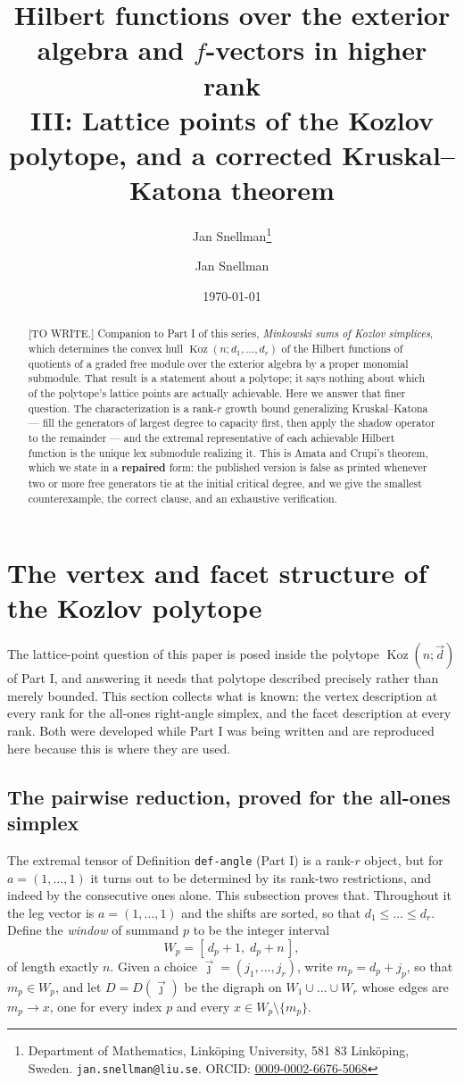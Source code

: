 \documentclass[11pt, a4paper, abstract=yes]{scrartcl}
\author{Jan Snellman\thanks{Department of Mathematics, Linköping University, 581 83 Linköping, Sweden. \texttt{jan.snellman@liu.se}. ORCID: \href{https://orcid.org/0009-0002-6676-5068}{0009-0002-6676-5068}}}
\author{Jan Snellman \orcidlink{0009-0002-6676-5068}}
\date{\today}
\title{Hilbert functions over the exterior algebra and \(f\)-vectors in higher rank\\\medskip
\large III: Lattice points of the Kozlov polytope, and a corrected Kruskal--Katona theorem}
\theoremstyle{definition}
\theoremstyle{remark}
\theoremstyle{plain}
\newcommand{\Koz}{\operatorname{Koz}}
\begin{document}
\maketitle
\begin{abstract}
{[}TO WRITE.] Companion to Part I of this series, \emph{Minkowski sums of Kozlov simplices}, which determines the convex hull \(\Koz(n;d_1,\dots,d_r)\) of
the Hilbert functions of quotients of a graded free module over the exterior algebra by a proper
monomial submodule. That result is a statement about a polytope; it says nothing about which of the
polytope's lattice points are actually achievable. Here we answer that finer question. The
characterization is a rank-\(r\) growth bound generalizing Kruskal--Katona --- fill the generators of
largest degree to capacity first, then apply the shadow operator to the remainder --- and the
extremal representative of each achievable Hilbert function is the unique lex submodule realizing
it. This is Amata and Crupi's theorem, which we state in a \textbf{repaired} form: the published version is
false as printed whenever two or more free generators tie at the initial critical degree, and we give
the smallest counterexample, the correct clause, and an exhaustive verification.
\end{abstract}

\setcounter{tocdepth}{2}
\tableofcontents
\section{The vertex and facet structure of the Kozlov polytope}
\label{sec:org6a57ba1}
The lattice-point question of this paper is posed inside the polytope \(\Koz(n;\vec d)\) of Part I,
and answering it needs that polytope described precisely rather than merely bounded. This section
collects what is known: the vertex description at every rank for the all-ones right-angle simplex,
and the facet description at every rank. Both were developed while Part I was being written and are
reproduced here because this is where they are used.
\subsection{The pairwise reduction, proved for the all-ones simplex}
\label{sec:orga5ed02d}
The extremal tensor of Definition \texttt{def-angle} (Part I) is a rank-\(r\) object, but for \(a=(1,\dots,1)\) it
turns out to be determined by its rank-two restrictions, and indeed by the consecutive ones alone.
This subsection proves that. Throughout it the leg vector is \(a=(1,\dots,1)\) and the shifts are
sorted, so that \(d_1\le\dots\le d_r\). Define the \emph{window} of summand \(p\) to be the integer
interval
\[
  W_p=[\,d_p+1,\;d_p+n\,],
\]
of length exactly \(n\). Given a choice \(\vec\jmath=(j_1,\dots,j_r)\), write \(m_p=d_p+j_p\), so
that \(m_p\in W_p\), and let \(D=D(\vec\jmath)\) be the digraph on \(W_1\cup\dots\cup W_r\) whose
edges are \(m_p\to x\), one for every index \(p\) and every \(x\in W_p\setminus\{m_p\}\).
\end{document}
